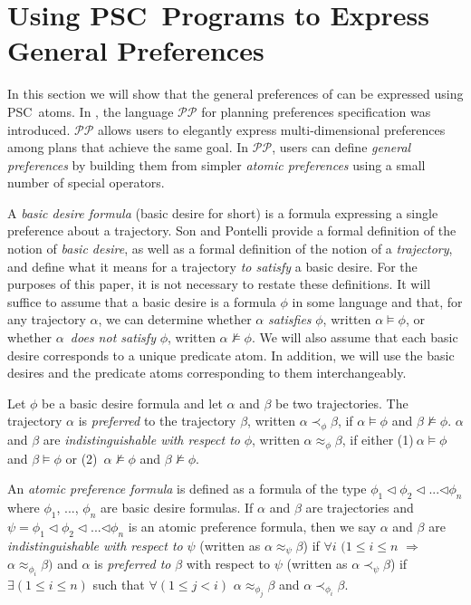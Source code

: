 \documentclass[letterpaper]{article}\usepackage{aaai}
\begin{document}
\section{Using PSC\ Programs to Express General Preferences}

In this section we will show that the general preferences of \cite{SP} can be
expressed using PSC\ atoms. In \cite{SP}, the language $\mathcal{PP}$ for
planning preferences specification was introduced. $\mathcal{PP}$ allows users
to elegantly express multi-dimensional preferences among plans that achieve
the same goal. In $\mathcal{PP}$, users can define \emph{general preferences}
by building them from simpler \emph{atomic preferences} using a small number
of special operators.

A \emph{basic desire formula} (basic desire for short) is a formula expressing
a single preference about a trajectory. Son and Pontelli provide a formal
definition of the notion of \emph{basic desire}, as well as a formal
definition of the notion of a \emph{trajectory}, and define what it means for
a trajectory \emph{to satisfy} a basic desire. For the purposes of this paper,
it is not necessary to restate these definitions. It will suffice to assume
that a basic desire is a formula $\phi$ in some language and that, for any
trajectory $\alpha$, we can determine whether $\alpha$ \emph{satisfies} $\phi
$, written $\alpha\models\phi$, or whether $\alpha$\emph{\ does not satisfy
}$\phi$, written $\alpha\not \models \phi$. We will also assume that each
basic desire corresponds to a unique predicate atom. In addition, we will use
the basic desires and the predicate atoms corresponding to them interchangeably.

Let $\phi$ be a basic desire formula and let $\alpha$ and $\beta$ be two
trajectories. The trajectory $\alpha$ is \emph{preferred} to the trajectory
$\beta$, written $\alpha\prec_{\phi}\beta$, if $\alpha\models\phi$ and
$\beta\not \models \phi$. $\alpha$ and $\beta$ are \emph{indistinguishable
with respect to }$\phi$, written $\alpha\approx_{\phi}\beta$, if either
(1)$\ \alpha\models\phi$ and $\beta\models\phi$ or (2)\ $\alpha\not \models
\phi$ and $\beta\not \models \phi$.

An \emph{atomic preference formula} is defined as a formula of the type
$\phi_{1}\lhd\phi_{2}\lhd$...$\lhd\phi_{n}$ where $\phi_{1}$, ..., $\phi_{n}$
are basic desire formulas. If $\alpha$ and $\beta$ are trajectories and
$\psi=\phi_{1}\lhd\phi_{2}\lhd$...$\lhd\phi_{n}$ is an atomic preference
formula, then we say $\alpha$ and $\beta$ are \emph{indistinguishable with
respect to }$\psi$ (written as $\alpha\approx_{\psi}\beta$) if $\forall i$
$(1\leq i\leq n$ $\Rightarrow$ $\alpha\approx_{\phi_{i}}\beta)$ and $\alpha$
is \emph{preferred to }$\beta$ with respect to $\psi$ (written as $\alpha
\prec_{\psi}\beta$) if $\exists\left(  1\leq i\leq n\right)  $ such that
$\forall\left(  1\leq j<i\right)  $ $\alpha\approx_{\phi_{j}}\beta$ and
$\alpha\prec_{\phi_{i}}\beta$.
\end{document}
